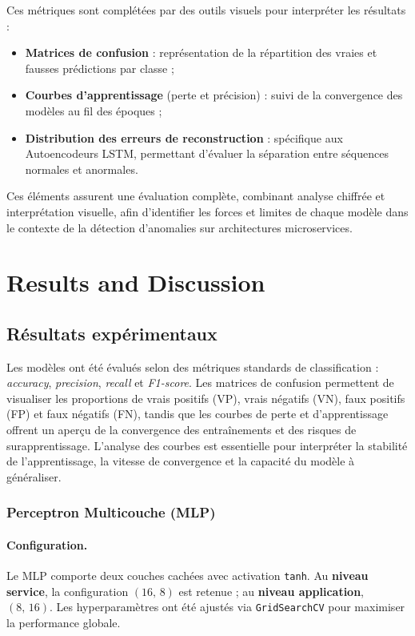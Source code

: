 \documentclass[conference]{IEEEtran}
\begin{document}
Ces métriques sont complétées par des outils visuels pour interpréter les résultats :
\begin{itemize}
    \item \textbf{Matrices de confusion} : représentation de la répartition des vraies et fausses prédictions par classe ;
    \item \textbf{Courbes d’apprentissage} (perte et précision) : suivi de la convergence des modèles au fil des époques ;
    \item \textbf{Distribution des erreurs de reconstruction} : spécifique aux Autoencodeurs LSTM, permettant d’évaluer la séparation entre séquences normales et anormales.
\end{itemize}

Ces éléments assurent une évaluation complète, combinant analyse chiffrée et interprétation visuelle, afin d’identifier les forces et limites de chaque modèle dans le contexte de la détection d’anomalies sur architectures microservices.

\section{Results and Discussion}

\subsection{Résultats expérimentaux}

Les modèles ont été évalués selon des métriques standards de classification : \textit{accuracy}, \textit{precision}, \textit{recall} et \textit{F1-score}. Les matrices de confusion permettent de visualiser les proportions de vrais positifs (VP), vrais négatifs (VN), faux positifs (FP) et faux négatifs (FN), tandis que les courbes de perte et d’apprentissage offrent un aperçu de la convergence des entraînements et des risques de surapprentissage. L'analyse des courbes est essentielle pour interpréter la stabilité de l'apprentissage, la vitesse de convergence et la capacité du modèle à généraliser.


\subsubsection{\textbf{Perceptron Multicouche (MLP)}}

\paragraph{Configuration.}
Le MLP comporte deux couches cachées avec activation \texttt{tanh}. 
Au \textbf{niveau service}, la configuration $(16,\,8)$ est retenue ; au \textbf{niveau application}, $(8,\,16)$. 
Les hyperparamètres ont été ajustés via \texttt{GridSearchCV} pour maximiser la performance globale.
\end{document}
